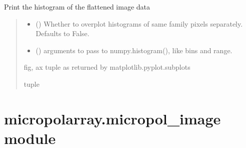 \documentclass[letterpaper,10pt,english]{sphinxmanual}
\begin{document}
\begin{fulllineitems}
\begin{fulllineitems}
\label{\detokenize{micropolarray:micropolarray.image.Image.show_histogram}}
\pysigstartsignatures
{}
\pysigstopsignatures
\sphinxAtStartPar
Print the histogram of the flattened image data
\begin{quote}\begin{description}
\begin{itemize}
\item {} 
\sphinxAtStartPar
{} (\sphinxstyleliteralemphasis{\sphinxupquote{, }}) \textendash{} Whether to overplot histograms of same family pixels separately. Defaults to False.

\item {} 
\sphinxAtStartPar
{} (\sphinxstyleliteralemphasis{\sphinxupquote{, }}) \textendash{} arguments to pass to numpy.histogram(), like bins and range.

\end{itemize}

\sphinxAtStartPar
fig, ax tuple as returned by matplotlib.pyplot.subplots

\sphinxAtStartPar
tuple

\end{description}\end{quote}

\end{fulllineitems}


\end{fulllineitems}



\section{micropolarray.micropol\_image module}
\label{\detokenize{micropolarray:module-micropolarray.micropol_image}}\label{\detokenize{micropolarray:micropolarray-micropol-image-module}}
\end{document}
